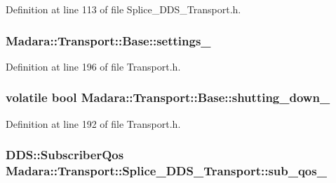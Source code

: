 Definition at line 113 of file Splice\_\-DDS\_\-Transport.h.

\hypertarget{classMadara_1_1Transport_1_1Base_adafa1a5641aaecae76d963748bddf8e2}{
\subsubsection[{settings\_\-}]{ {\bf Madara::Transport::Base::settings\_\-}}}
\label{dc/d97/classMadara_1_1Transport_1_1Base_adafa1a5641aaecae76d963748bddf8e2}


Definition at line 196 of file Transport.h.

\hypertarget{classMadara_1_1Transport_1_1Base_a6c3d03895e92c93265704052ab707f8a}{
\subsubsection[{shutting\_\-down\_\-}]{\setlength{\rightskip}{0pt plus 5cm}volatile bool {\bf Madara::Transport::Base::shutting\_\-down\_\-}}}
\label{dc/d97/classMadara_1_1Transport_1_1Base_a6c3d03895e92c93265704052ab707f8a}


Definition at line 192 of file Transport.h.

\hypertarget{classMadara_1_1Transport_1_1Splice__DDS__Transport_a681519cff73607a11505c71be751e78c}{
\subsubsection[{sub\_\-qos\_\-}]{\setlength{\rightskip}{0pt plus 5cm}DDS::SubscriberQos {\bf Madara::Transport::Splice\_\-DDS\_\-Transport::sub\_\-qos\_\-}}}
\label{d0/d91/classMadara_1_1Transport_1_1Splice__DDS__Transport_a681519cff73607a11505c71be751e78c}


